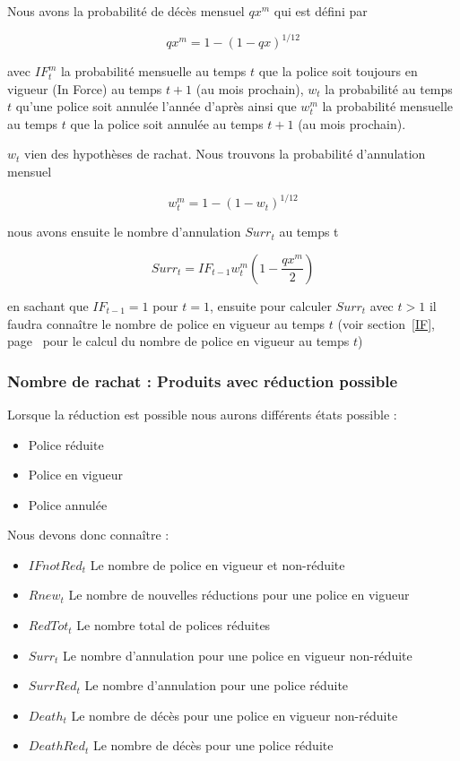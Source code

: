 \documentclass{article}
\begin{document}
Nous avons la probabilité de décès mensuel $qx^m$ qui est défini par

\begin{equation}
  qx^m = 1-(1-qx)^{1/12}
\end{equation}

\noindent avec $IF^m_t$ la probabilité mensuelle au temps $t$ que la police soit toujours en vigueur (In Force) au temps $t+1$ (au mois prochain), $w_{t}$ la probabilité au temps $t$ qu'une police soit annulée l'année d'après ainsi que $w^m_{t}$ la probabilité mensuelle au temps $t$ que la police soit annulée au temps $t + 1$ (au mois prochain).

\hfill \break $w_{t}$ vien des hypothèses de rachat. Nous trouvons la probabilité d'annulation mensuel

\begin{equation}
 w^m_{t} = 1-(1-w_{t})^{1/12} 
\end{equation}



\noindent nous avons ensuite le nombre d'annulation $Surr_t$ au temps t

\begin{equation}
  Surr_t = IF_{t-1} w^m_{t}(1- \frac{qx^m}{2})
\end{equation}

en sachant que $IF_{t-1} = 1$ pour $t = 1$, ensuite pour calculer $Surr_t$ avec $t>1$ il faudra connaître le nombre de police en vigueur au temps $t$ (voir section~\ref{IF}, page~\pageref{IF} pour le calcul du nombre de police en vigueur au temps $t$)

\subsubsection{Nombre de rachat : Produits avec réduction possible}

Lorsque la réduction est possible nous aurons différents états possible :
\begin{itemize}
\item Police réduite
\item Police en vigueur
\item Police annulée\\
\end{itemize}
Nous devons donc connaître :

\begin{itemize}
\item $IFnotRed_t$ Le nombre de police en vigueur et non-réduite
\item $Rnew_t$ Le nombre de nouvelles réductions pour une police en vigueur 
\item $RedTot_t$ Le nombre total de polices réduites
\item $Surr_t$ Le nombre d'annulation pour une police en vigueur non-réduite
\item $SurrRed_t$ Le nombre d'annulation pour une police réduite
\item $Death_t$ Le nombre de décès pour une police en vigueur non-réduite
\item $DeathRed_t$ Le nombre de décès pour une police réduite\\
\end{itemize}
\end{document}
